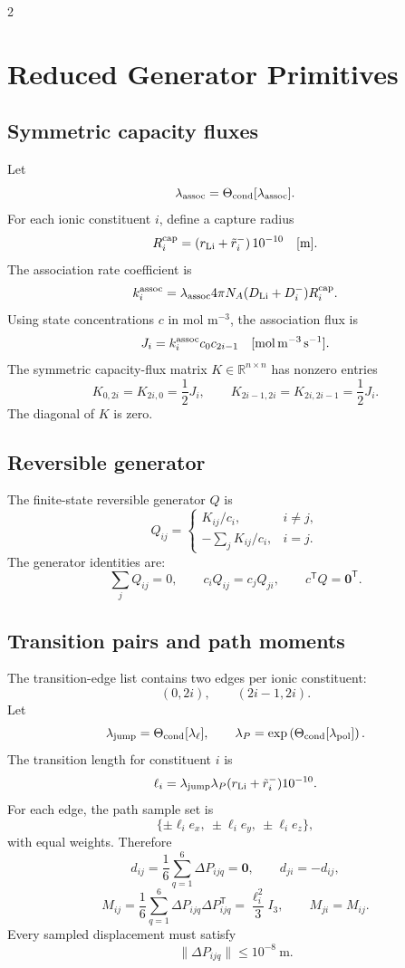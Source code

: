 \documentclass[10pt]{article}
\newcommand{\R}{\mathbb{R}}
\newcommand{\T}{\mathsf{T}}
\newcommand{\zero}{\mathbf{0}}
\begin{document}
\begin{multicols}{2}
\section{Reduced Generator Primitives}

\subsection{Symmetric capacity fluxes}

Let
\[
\lambda_{\rm assoc}
=
\Theta_{\rm cond}[\lambda_{\rm assoc}].
\]
For each ionic constituent \(i\), define a capture radius
\[
R^{\rm cap}_i=(r_{\rm Li}+\tilde r^-_i)\,10^{-10}\quad [\mathrm m].
\]
The association rate coefficient is
\[
k^{\rm assoc}_i
=
\lambda_{\rm assoc}
4\pi N_A
(D_{\rm Li}+D^-_i)
R^{\rm cap}_i.
\]
Using state concentrations \(c\) in mol m\(^{-3}\), the association flux is
\[
J_i
=
k^{\rm assoc}_i c_0 c_{2i-1}
\quad [\mathrm{mol\,m^{-3}\,s^{-1}}].
\]
The symmetric capacity-flux matrix \(K\in\R^{n\times n}\) has nonzero entries
\[
K_{0,2i}=K_{2i,0}=\frac{1}{2}J_i,
\qquad
K_{2i-1,2i}=K_{2i,2i-1}=\frac{1}{2}J_i.
\]
The diagonal of \(K\) is zero.

\subsection{Reversible generator}

The finite-state reversible generator \(Q\) is
\[
Q_{ij}=
\begin{cases}
K_{ij}/c_i, & i\ne j,\\
-\sum_jK_{ij}/c_i, & i=j.
\end{cases}
\]
The generator identities are:
\[
\sum_j Q_{ij}=0,
\qquad
c_iQ_{ij}=c_jQ_{ji},
\qquad
c^\T Q=\zero^\T.
\]

\subsection{Transition pairs and path moments}

The transition-edge list contains two edges per ionic constituent:
\[
(0,2i),
\qquad
(2i-1,2i).
\]
Let
\[
\lambda_{\rm jump}
=\Theta_{\rm cond}[\lambda_\ell],
\qquad
\lambda_P
=\exp\left(\Theta_{\rm cond}[\lambda_{\rm pol}]\right).
\]
The transition length for constituent \(i\) is
\[
\ell_i
=
\lambda_{\rm jump}\lambda_P(r_{\rm Li}+\tilde r^-_i)10^{-10}.
\]
For each edge, the path sample set is
\[
\{\pm\ell_i e_x,\ \pm\ell_i e_y,\ \pm\ell_i e_z\},
\]
with equal weights. Therefore
\[
d_{ij}
=
\frac{1}{6}\sum_{q=1}^6\Delta P_{ijq}
=\zero,
\qquad
d_{ji}=-d_{ij},
\]
\[
M_{ij}
=
\frac{1}{6}\sum_{q=1}^6\Delta P_{ijq}\Delta P_{ijq}^{\T}
=
\frac{\ell_i^2}{3}I_3,
\qquad
M_{ji}=M_{ij}.
\]
Every sampled displacement must satisfy
\[
\|\Delta P_{ijq}\|\le10^{-8}\ \mathrm m.
\]


\end{multicols}
\end{document}

